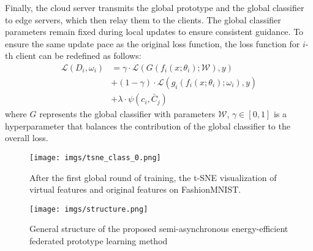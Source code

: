 \documentclass[journal]{IEEEtran}
\begin{document}
Finally, the cloud server transmits the global prototype and the global classifier to edge servers, which then relay them to the clients. The global classifier parameters remain fixed during local updates to ensure consistent guidance. To ensure the same update pace as the original loss function, the loss function for $i$-th client can be redefined as follows:
\begin{align}
  \label{SAE loss function}
  \mathcal{L}(D_i,\omega_i) &= \gamma \cdot \mathcal{L}(G(f_i(x;\theta_i); \mathcal{W}), y) \nonumber\\ 
  &+ (1-\gamma)\cdot \mathcal{L}(g_i(f_i(x;\theta_i); \omega_i), y)  \nonumber \\ 
  &+ \lambda \cdot \psi(c_{i}, \bar{C}_j)
\end{align}
where $G$ represents the global classifier with parameters $\mathcal{W}$, $\gamma \in [0,1]$ is a hyperparameter that balances the contribution of the global classifier to the overall loss. 


\begin{figure}
  \centering
  \texttt{[image: imgs/tsne\_class\_0.png]}
  \caption{After the first global round of training, the t-SNE visualization of virtual features and original features on FashionMNIST.}
  \label{tsne_class_0}
\end{figure}

\begin{figure*}[h]
    \centering
    \texttt{[image: imgs/structure.png]}
    \caption{General structure of the proposed semi-asynchronous energy-efficient federated prototype learning method}
    \label{fig:structure}
\end{figure*}

\end{document}
